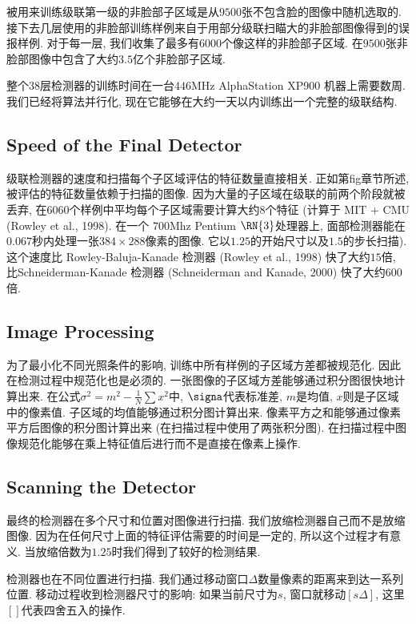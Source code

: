 \documentclass[utf8]{ctexart}
\begin{document}
被用来训练级联第一级的非脸部子区域是从$9500$张不包含脸的图像中随机选取的. 接下去几层使用的非脸部训练样例来自于用部分级联扫瞄大的非脸部图像得到的误报样例. 对于每一层, 我们收集了最多有$6000$个像这样的非脸部子区域. 在$9500$张非脸部图像中包含了大约$3.5$亿个非脸部子区域.

整个$38$层检测器的训练时间在一台$446$MHz AlphaStation XP900 机器上需要数周. 我们已经将算法并行化, 现在它能够在大约一天以内训练出一个完整的级联结构.

\subsection{Speed of the Final Detector}
级联检测器的速度和扫描每个子区域评估的特征数量直接相关. 正如第fig章节所述, 被评估的特征数量依赖于扫描的图像. 因为大量的子区域在级联的前两个阶段就被丢弃, 在$6060$个样例中平均每个子区域需要计算大约$8$个特征 (计算于 MIT + CMU (Rowley et al., 1998). 在一个 $700$Mhz Pentium $\RN{3}$处理器上, 面部检测器能在$0.067$秒内处理一张$384\times288$像素的图像. 它以$1.25$的开始尺寸以及$1.5$的步长扫描). 这个速度比 Rowley-Baluja-Kanade 检测器 (Rowley et al., 1998) 快了大约$15$倍, 比Schneiderman-Kanade 检测器 (Schneiderman and Kanade, 2000) 快了大约$600$倍.

\subsection{Image Processing}
为了最小化不同光照条件的影响, 训练中所有样例的子区域方差都被规范化. 因此在检测过程中规范化也是必须的. 一张图像的子区域方差能够通过积分图很快地计算出来. 在公式$\sigma^2=m^2-\frac1N\sum x^2$中, $\signa$代表标准差, $m$是均值, $x$则是子区域中的像素值. 子区域的均值能够通过积分图计算出来. 像素平方之和能够通过像素平方后图像的积分图计算出来 (在扫描过程中使用了两张积分图).
在扫描过程中图像规范化能够在乘上特征值后进行而不是直接在像素上操作.

\subsection{Scanning the Detector}
最终的检测器在多个尺寸和位置对图像进行扫描. 我们放缩检测器自己而不是放缩图像. 因为在任何尺寸上面的特征评估需要的时间是一定的, 所以这个过程才有意义. 当放缩倍数为$1.25$时我们得到了较好的检测结果.

检测器也在不同位置进行扫描. 我们通过移动窗口$\Delta$数量像素的距离来到达一系列位置. 移动过程收到检测器尺寸的影响: 如果当前尺寸为$s$, 窗口就移动$[s\Delta]$, 这里$[]$代表四舍五入的操作.
\end{document}
